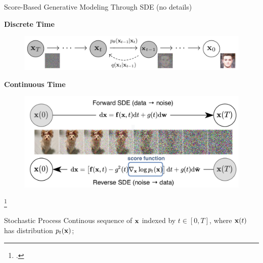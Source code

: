 \documentclass[aspectratio=169, 10pt]{beamer}
\theoremstyle{definition}
\begin{document}
\begin{frame}{Score-Based Generative Modeling Through SDE (no details)}
  \begin{minipage}[h]{0.45\textwidth}
    \begin{center}
      \footnotesize 
      \textbf{Discrete Time}
    \end{center}
    \begin{figure}[h]
      \centering
      \includegraphics[width=\textwidth]{./pic/ho_diffusion.png}
    \end{figure}
  \end{minipage}\hfill%
  \begin{minipage}[h]{0.45\textwidth}
    \begin{center}
      \footnotesize 
      \textbf{\color{rred} Continuous Time}\\
    \end{center}
    \begin{figure}[h]
      \centering
      \includegraphics[width=\textwidth]{./pic/sda_intro.png}
    \end{figure}
  \end{minipage}\footcite{sde}
  \begin{block}{Stochastic Process}
    Continous sequence of ${\mathbf{x}}$ indexed by $t\in\left[ 0,T \right]$, where ${\mathbf{x}}(t)$ has distribution $p_t({\mathbf{x}})$;
  \end{block}
\end{frame}
\end{document}
